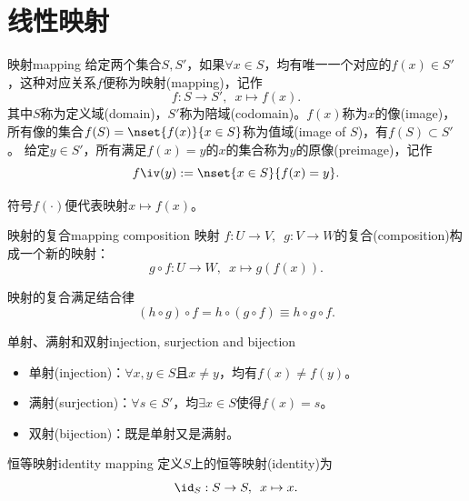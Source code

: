 \chapter{线性映射}
\label{chap:linear mapping}

\begin{definition}{映射}{mapping}
	给定两个集合$S,S'$，如果$\forall x\in S$，均有唯一一个对应的$f(x)\in S'$，这种对应关系$f$便称为映射(mapping)，记作
	\begin{equation}
		f:S\to S',\enspace x\mapsto f(x).
	\end{equation}
	其中$S$称为定义域(domain)，$S'$称为陪域(codomain)。$f(x)$称为$x$的像(image)，所有像的集合$f(S)=\nset{f(x)}{x\in S}$称为值域(image of $S$)，有$f(S)\subset S'$。
	\tcblower
	给定$y\in S'$，所有满足$f(x)=y$的$x$的集合称为$y$的原像(preimage)，记作
	\begin{equation}
		f\iv(y):=\nset{x\in S}{f(x)=y}.
	\end{equation}
\end{definition}

\begin{remark}
	符号$f(\cdot)$便代表映射$x\mapsto f(x)$。
\end{remark}

\begin{definition}{映射的复合}{mapping composition}
	映射 $f:U\to V,\enspace g:V\to W$的复合(composition)构成一个新的映射：
	\[
		g\circ f:U\to W,\enspace x\mapsto g(f(x)).
	\]
\end{definition}
\begin{corollary}
	映射的复合满足结合律
	\[
		(h\circ g)\circ f=h\circ (g\circ f)\equiv h\circ g\circ f.
	\]
\end{corollary}
\begin{definition}{单射、满射和双射}{injection, surjection and bijection}
	\begin{itemize}
		\item 单射(injection)：$\forall x,y\in S$且$x\neq y$，均有$f(x)\neq f(y)$。
		\item 满射(surjection)：$\forall s\in S'$，均$\exists x\in S$使得$f(x)=s$。%
		\item 双射(bijection)：既是单射又是满射。
	\end{itemize}
\end{definition}

\begin{definition}
	{恒等映射}{identity mapping}
	定义$S$上的恒等映射(identity)为
	\begin{equation}
		\id_S:S\to S,\enspace x\mapsto x.
	\end{equation}
\end{definition}

